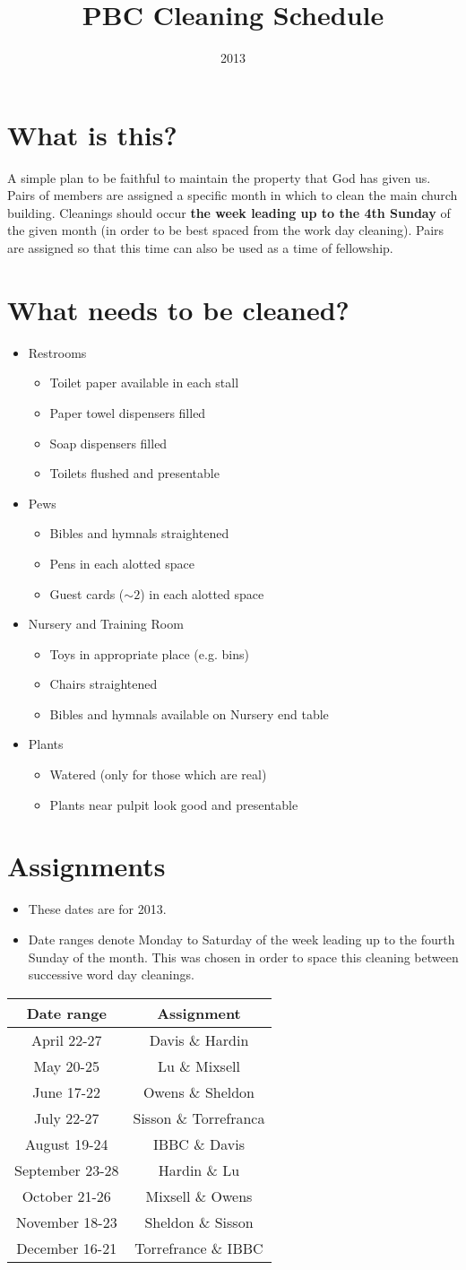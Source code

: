 \documentclass[12pt]{article}
\title{PBC Cleaning Schedule}
\date{2013}
\newcommand{\BI}{\begin{itemize}\item}
\newcommand{\I}{\item}
\newcommand{\EI}{\end{itemize}}
\begin{document}
\maketitle
\section{What is this?}
A simple plan to be faithful to maintain the property that God has given us.
Pairs of members are assigned a specific month in which
    to clean the main church building.
Cleanings should occur \textbf{the week leading up to the 4th Sunday} 
    of the given month 
    (in order to be best spaced from the work day cleaning).
Pairs are assigned so that this time can also be used as a time of fellowship.

\section{What needs to be cleaned?}
\BI Restrooms
    \BI Toilet paper available in each stall
    \I  Paper towel dispensers filled
    \I  Soap dispensers filled
    \I  Toilets flushed and presentable \EI
\I  Pews
    \BI Bibles and hymnals straightened
    \I  Pens in each alotted space
    \I  Guest cards ($\sim2$) in each alotted space \EI
\I  Nursery and Training Room
    \BI Toys in appropriate place (e.g. bins)
    \I  Chairs straightened
    \I  Bibles and hymnals available on Nursery end table \EI
\I  Plants
    \BI Watered (only for those which are real)
    \I  Plants near pulpit look good and presentable \EI
\EI
\section{Assignments}
\BI These dates are for 2013.
\I  Date ranges denote Monday to Saturday of the week leading 
        up to the fourth Sunday of the month.
    This was chosen in order to space this cleaning between
        successive word day cleanings. \EI
\begin{center}
\begin{tabular}{|c|c|}
    \hline
    Date range & Assignment \\
    \hline \hline
    April 22-27 & Davis \& Hardin \\ \hline
    May 20-25 & Lu \& Mixsell \\ \hline
    June 17-22 & Owens \& Sheldon \\ \hline
    July  22-27 & Sisson \& Torrefranca \\ \hline
    August 19-24 & IBBC \& Davis \\ \hline
    September 23-28 & Hardin \& Lu \\ \hline
    October 21-26 & Mixsell \& Owens \\ \hline
    November 18-23 & Sheldon \& Sisson \\ \hline
    December 16-21 & Torrefrance \& IBBC \\ \hline
\end{tabular}
\end{center}
\end{document}
